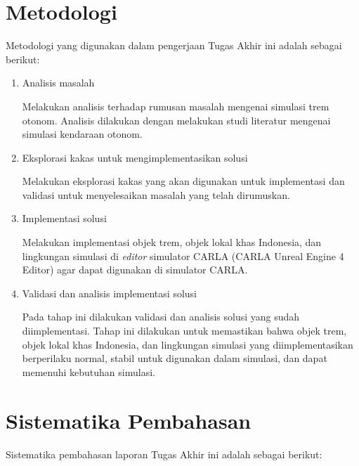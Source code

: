\section{Metodologi}

Metodologi yang digunakan dalam pengerjaan Tugas Akhir ini adalah sebagai
berikut:

\begin{enumerate}

    \item Analisis masalah

    Melakukan analisis terhadap rumusan masalah mengenai simulasi trem otonom.
    Analisis dilakukan dengan melakukan studi literatur mengenai simulasi
    kendaraan otonom.

    \item Eksplorasi kakas untuk mengimplementasikan solusi

    Melakukan eksplorasi kakas yang akan digunakan untuk implementasi dan
    validasi untuk menyelesaikan masalah yang telah dirumuskan.

    \item Implementasi solusi

    Melakukan implementasi objek trem, objek lokal khas Indonesia, dan
    lingkungan simulasi di \textit{editor} simulator CARLA (CARLA Unreal Engine
    4 Editor) agar dapat digunakan di simulator CARLA.

    \item Validasi dan analisis implementasi solusi

    Pada tahap ini dilakukan validasi dan analisis solusi yang sudah
    diimplementasi. Tahap ini dilakukan untuk memastikan bahwa objek trem, objek
    lokal khas Indonesia, dan lingkungan simulasi yang diimplementasikan
    berperilaku normal, stabil untuk digunakan dalam simulasi, dan dapat
    memenuhi kebutuhan simulasi.

\end{enumerate}

\section{Sistematika Pembahasan}

Sistematika pembahasan laporan Tugas Akhir ini adalah sebagai berikut:

